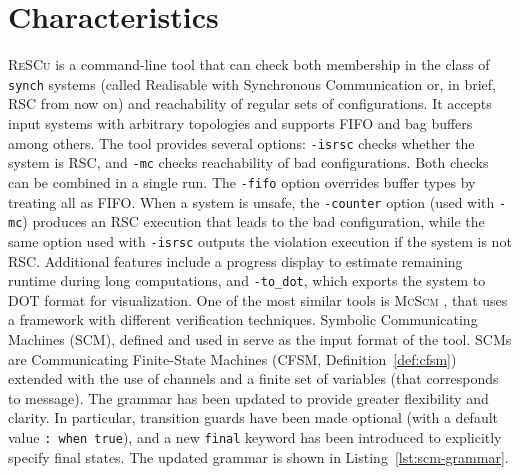 \section{Characteristics}
\textsc{ReSCu} is a command-line tool that can check both membership in the 
class of \verb|synch| systems (called Realisable with Synchronous Communication 
or, in brief, RSC from now on) and reachability of regular sets of configurations. It 
accepts input systems with arbitrary topologies and supports FIFO and 
bag buffers among others. The tool provides several options: 
\verb|-isrsc| checks whether the system is RSC, and \verb|-mc| checks reachability of 
bad configurations. Both checks can be combined in a single run. The \verb|-fifo| option 
overrides buffer types by treating all as FIFO. When a system is unsafe, the 
\verb|-counter| option (used with \verb|-mc|) produces an RSC execution that leads 
to the bad configuration, while the same option used with \verb|-isrsc| outputs the %
violation execution if the system is not RSC. Additional features include 
a progress display to estimate remaining runtime during long computations, and 
\verb|-to_dot|, which exports the system to DOT format for visualization.
One of the most similar tools is \textsc{McScm} \cite{heussner2012mcscm}, that
uses a framework with different verification techniques. 
Symbolic Communicating Machines (SCM), defined and used in \cite[Definition 5.1]{le2008abstract}
serve as the input format of the tool. SCMs are Communicating 
Finite-State Machines (CFSM, Definition~\ref{def:cfsm}) 
extended with the use of channels and a finite set of variables (that 
corresponds to message).
The grammar has been updated to provide greater flexibility and clarity. In
particular, transition guards have been made optional (with a default value
\verb|: when true|), and a new \verb|final| keyword has been introduced to
explicitly specify final states. The updated grammar is shown in
Listing~\ref{lst:scm-grammar}. 

